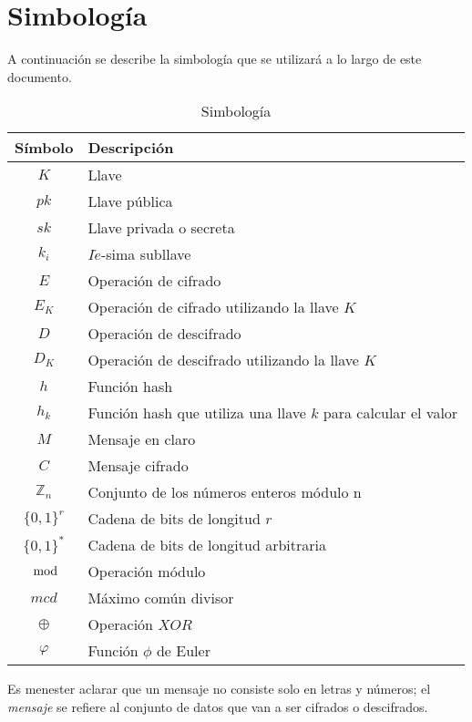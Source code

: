%
%

\section*{Simbología}

A continuación se describe la simbología que se utilizará a lo largo de
este documento.

\begin{table}[H]
  \caption{Simbología}\label{tab:simb}
  \begin{center}
    \begin{tabular}{c|l}
      Símbolo & Descripción \\
      \hline
      $K$ & Llave \\
      \hline
      $pk$ & Llave pública \\
      \hline
      $sk$ & Llave privada o secreta \\
      \hline
      $k_i$ & $I\acute{e}$-sima subllave \\
      \hline
      $E$ & Operación de cifrado \\
      \hline
      $E_K$ & Operación de cifrado utilizando la llave $K$ \\
      \hline
      $D$ & Operación de descifrado \\
      \hline
      $D_K$ & Operación de descifrado utilizando la llave $K$ \\
      \hline
      $h$ & Función hash \\
      \hline
      $h_k$ & Función hash que utiliza una llave $k$ para calcular el valor\\
      \hline
      $M$ & Mensaje en claro\\
      \hline
      $C$ & Mensaje cifrado\\
      \hline
      $\mathbb{Z}_n$ & Conjunto de los números enteros módulo n\\
      \hline
      $\{0,1\}^r$ & Cadena de bits de longitud $r$ \\
      \hline
      $\{0,1\}^*$ & Cadena de bits de longitud arbitraria \\
      \hline
      $\mod$ & Operación módulo \\
      \hline
      $mcd$ & Máximo común divisor \\
      \hline
      $\oplus$ & Operación $XOR$ \\
      \hline
      $\varphi$ & Función $\phi$ de Euler \\
      \hline
    \end{tabular}
  \end{center}
\end{table}

Es menester aclarar que un mensaje no consiste solo en letras y números;
el \textit{mensaje} se refiere al conjunto de datos que van a ser
cifrados o descifrados.
